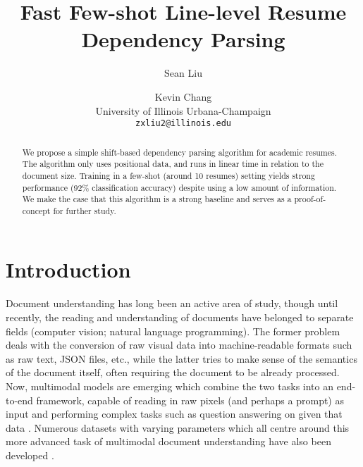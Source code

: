 \documentclass[11pt]{article}
\title{Fast Few-shot Line-level Resume Dependency Parsing}
\author{Sean Liu \and Kevin Chang\\
  University of Illinois Urbana-Champaign\\
  \texttt{zxliu2@illinois.edu} \\}
\begin{document}
\maketitle
\begin{abstract}
We propose a simple shift-based dependency parsing algorithm for academic resumes. The algorithm only uses positional data, and runs in linear time in relation to the document size. Training in a few-shot (around 10 resumes) setting yields strong performance (92\% classification accuracy) despite using a low amount of information. We make the case that this algorithm is a strong baseline and serves as a proof-of-concept for further study.
\end{abstract}

\section{Introduction}

Document understanding has long been an active area of study, though until recently, the reading and understanding of documents have belonged to separate fields (computer vision; natural language programming). The former problem deals with the conversion of raw visual data into machine-readable formats such as raw text, JSON files, etc., while the latter tries to make sense of the semantics of the document itself, often requiring the document to be already processed. Now, multimodal models are emerging which combine the two tasks into an end-to-end framework, capable of reading in raw pixels (and perhaps a prompt) as input and performing complex tasks such as question answering on given that data  \citep{huang2022layoutlmv3,lee2022pix2struct, kim2021ocr}. Numerous datasets with varying parameters which all centre around this more advanced task of multimodal document understanding have also been developed \citep{mathew2021docvqa,mathew2022infographicvqa,park2019cord}.
\end{document}
